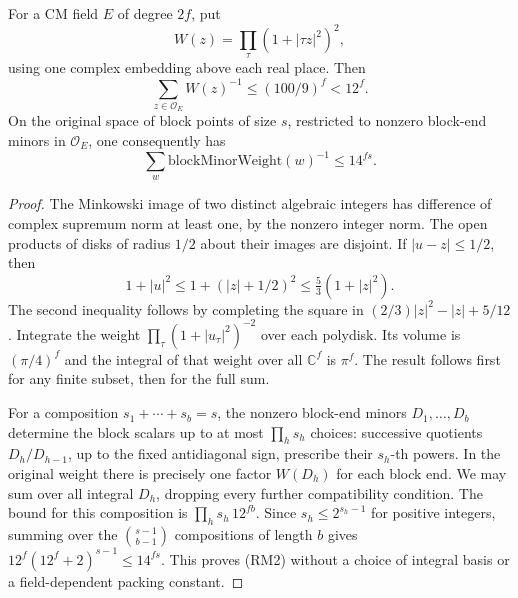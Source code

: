 \begin{lemma}
\label{lem:flag-endpoint-packing}
For a CM field \(E\) of degree \(2f\), put
\[
 W(z)=\prod_{\tau}(1+|\tau z|^2)^2 ,
\]
using one complex embedding above each real place.
Then
\[
 \sum_{z\in\mathcal O_E} W(z)^{-1}
        \le (100/9)^f < 12^f .
\]
On the original space of block points of size \(s\),
restricted to nonzero block-end minors in \(\mathcal O_E\),
one consequently has
\[
 \sum_w \mathrm{blockMinorWeight}(w)^{-1}
       \le 14^{fs}.                                      \tag{RM2}
\]
\end{lemma}
\begin{proof}
The Minkowski image of two distinct algebraic integers
has difference of complex supremum norm at least one,
by the nonzero integer norm. The open products of disks
of radius \(1/2\) about their images are disjoint.
If \(|u-z|\le1/2\), then
\[
 1+|u|^2\le 1+(|z|+1/2)^2
                    \le \tfrac53(1+|z|^2).
\]
The second inequality follows by completing the square
in \( (2/3)|z|^2-|z|+5/12\).
Integrate the weight \(\prod_\tau(1+|u_\tau|^2)^{-2}\)
over each polydisk. Its volume is \((\pi/4)^f\)
and the integral of that weight over all
\(\mathbb C^f\) is \(\pi^f\).
The result follows first for any finite subset,
then for the full sum.

For a composition \(s_1+\cdots+s_b=s\), the nonzero
block-end minors \(D_1,\ldots,D_b\) determine the
block scalars up to at most \(\prod_h s_h\) choices:
successive quotients \(D_h/D_{h-1}\), up to the
fixed antidiagonal sign, prescribe their \(s_h\)-th
powers. In the original weight there is precisely
one factor \(W(D_h)\) for each block end.
We may sum over all integral \(D_h\), dropping every
further compatibility condition. The bound for this
composition is \(\prod_h s_h\,12^{fb}\).
Since \(s_h\le2^{s_h-1}\) for positive integers,
summing over the \(\binom{s-1}{b-1}\) compositions
of length \(b\) gives
\(12^f(12^f+2)^{s-1}\le14^{fs}\).
This proves (RM2) without a choice of integral
basis or a field-dependent packing constant.
\end{proof}

